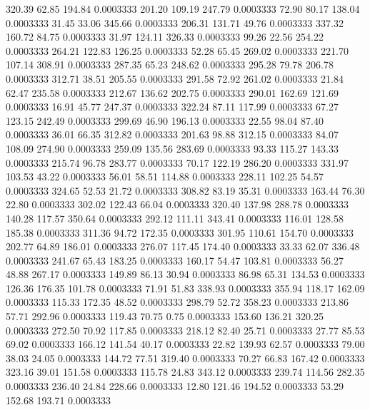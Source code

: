  320.39   62.85  194.84   0.0003333
 201.20  109.19  247.79   0.0003333
  72.90   80.17  138.04   0.0003333
  31.45   33.06  345.66   0.0003333
 206.31  131.71   49.76   0.0003333
 337.32  160.72   84.75   0.0003333
  31.97  124.11  326.33   0.0003333
  99.26   22.56  254.22   0.0003333
 264.21  122.83  126.25   0.0003333
  52.28   65.45  269.02   0.0003333
 221.70  107.14  308.91   0.0003333
 287.35   65.23  248.62   0.0003333
 295.28   79.78  206.78   0.0003333
 312.71   38.51  205.55   0.0003333
 291.58   72.92  261.02   0.0003333
  21.84   62.47  235.58   0.0003333
 212.67  136.62  202.75   0.0003333
 290.01  162.69  121.69   0.0003333
  16.91   45.77  247.37   0.0003333
 322.24   87.11  117.99   0.0003333
  67.27  123.15  242.49   0.0003333
 299.69   46.90  196.13   0.0003333
  22.55   98.04   87.40   0.0003333
  36.01   66.35  312.82   0.0003333
 201.63   98.88  312.15   0.0003333
  84.07  108.09  274.90   0.0003333
 259.09  135.56  283.69   0.0003333
  93.33  115.27  143.33   0.0003333
 215.74   96.78  283.77   0.0003333
  70.17  122.19  286.20   0.0003333
 331.97  103.53   43.22   0.0003333
  56.01   58.51  114.88   0.0003333
 228.11  102.25   54.57   0.0003333
 324.65   52.53   21.72   0.0003333
 308.82   83.19   35.31   0.0003333
 163.44   76.30   22.80   0.0003333
 302.02  122.43   66.04   0.0003333
 320.40  137.98  288.78   0.0003333
 140.28  117.57  350.64   0.0003333
 292.12  111.11  343.41   0.0003333
 116.01  128.58  185.38   0.0003333
 311.36   94.72  172.35   0.0003333
 301.95  110.61  154.70   0.0003333
 202.77   64.89  186.01   0.0003333
 276.07  117.45  174.40   0.0003333
  33.33   62.07  336.48   0.0003333
 241.67   65.43  183.25   0.0003333
 160.17   54.47  103.81   0.0003333
  56.27   48.88  267.17   0.0003333
 149.89   86.13   30.94   0.0003333
  86.98   65.31  134.53   0.0003333
 126.36  176.35  101.78   0.0003333
  71.91   51.83  338.93   0.0003333
 355.94  118.17  162.09   0.0003333
 115.33  172.35   48.52   0.0003333
 298.79   52.72  358.23   0.0003333
 213.86   57.71  292.96   0.0003333
 119.43   70.75    0.75   0.0003333
 153.60  136.21  320.25   0.0003333
 272.50   70.92  117.85   0.0003333
 218.12   82.40   25.71   0.0003333
  27.77   85.53   69.02   0.0003333
 166.12  141.54   40.17   0.0003333
  22.82  139.93   62.57   0.0003333
  79.00   38.03   24.05   0.0003333
 144.72   77.51  319.40   0.0003333
  70.27   66.83  167.42   0.0003333
 323.16   39.01  151.58   0.0003333
 115.78   24.83  343.12   0.0003333
 239.74  114.56  282.35   0.0003333
 236.40   24.84  228.66   0.0003333
  12.80  121.46  194.52   0.0003333
  53.29  152.68  193.71   0.0003333
